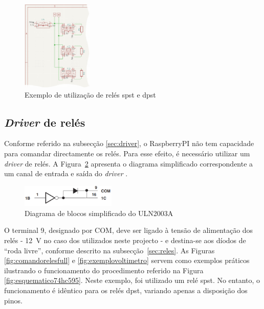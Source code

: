 \begin{figure}[hbtp]
	\centering
	\includegraphics[width=0.3\textwidth]{figures/exemplo_reles_spst.png}
	\caption{Exemplo de utilização de relés \acrshort{spst} e \acrshort{dpst}}
	\label{fig:relespstdpst}
\end{figure}

\subsection{\textit{Driver} de relés}
\label{sec:driverreles}
Conforme referido na subsecção \ref{sec:driver}, o \gls{RaspberryPI} não tem capacidade para comandar directamente os relés. Para esse efeito, é necessário utilizar um \textit{driver} de relés. A Figura~\ref{fig:diagramablocos2003} apresenta o diagrama simplificado correspondente a um canal de entrada e saída do \textit{driver} \cite{ULN2003}.

\begin{figure}[hbtp]
	\centering
	\includegraphics[width=0.4\textwidth]{figures/uln2003_diagramablocos.png}
	\caption{Diagrama de blocos simplificado do ULN2003A}
	\label{fig:diagramablocos2003}
\end{figure}

O terminal 9, designado por COM, deve ser ligado à tensão de alimentação dos relés - \SI{12}{\volt} no caso dos utilizados neste projecto - e destina-se aos díodos de ``roda livre'', conforme descrito na subsecção~\ref{sec:reles}. As Figuras \ref{fig:comandorelesfull} e \ref{fig:exemplovoltimetro} servem como exemplos práticos ilustrando o funcionamento do procedimento referido na Figura \ref{fig:esquematico74hc595}. Neste exemplo, foi utilizado um relé \acrshort{spst}. No entanto, o funcionamento é idêntico para os relés \acrshort{dpst}, variando apenas a disposição dos pinos.

